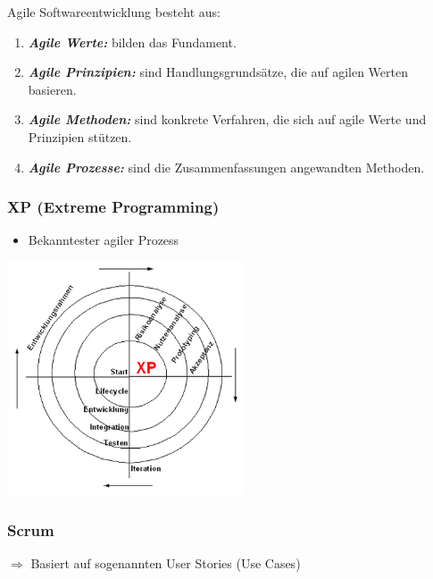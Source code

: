 Agile Softwareentwicklung besteht aus:
\begin{enumerate}
	\item \textbf{\textit{Agile Werte:}} bilden das Fundament.
	\item \textbf{\textit{Agile Prinzipien:}} sind Handlungsgrundsätze, die auf agilen Werten basieren.
	\item \textbf{\textit{Agile Methoden:}} sind konkrete Verfahren, die sich auf agile Werte und Prinzipien stützen.
	\item \textbf{\textit{Agile Prozesse:}} sind die Zusammenfassungen angewandten Methoden.
	\\ 
\end{enumerate}
\pagebreak
\begin{multicols}{2}
\subsubsection{XP (Extreme Programming)}
\begin{minipage}{10cm}
	\begin{itemize}
		\item Bekanntester agiler Prozess
	\end{itemize}
\end{minipage}
\begin{minipage}{5cm}
	\includegraphics[width=7cm]{images/extreme_programming.png}
\end{minipage}

\subsubsection{Scrum}
$\Rightarrow$ Basiert auf sogenannten User Stories (Use Cases)\\


\end{multicols}
